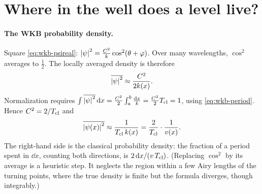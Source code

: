 \section{Where in the well does a level live?}\label{sec:wkb-where}

\paragraph{The WKB probability density.} Square \cref{eq:wkb-psireal}: $\left\lvert \psi\right\rvert^2=\frac{C^2}{k}\cos^2(\theta+\varphi)$. Over many wavelengths, $\cos^2$ averages to $\frac12$. The locally averaged density is therefore
\begin{equation}
\overline{\left\lvert \psi\right\rvert^2}\approx\frac{C^2}{2k(x)}.
\end{equation}
Normalization requires $\int\overline{\left\lvert \psi\right\rvert^2}\,\mathrm{d} x=\frac{C^2}{2}\int_a^b\frac{\mathrm{d} x}{k}=\frac{C^2}{2}T_{\rm cl}=1$, using \cref{eq:wkb-period}. Hence $C^2=2/T_{\rm cl}$ and
\begin{equation}
\overline{\left\lvert \psi(x)\right\rvert^2}\approx\frac{1}{T_{\rm cl}\,k(x)}=\frac{2}{T_{\rm cl}}\cdot\frac{1}{v(x)}.
\label{eq:wkb-density-x}
\end{equation}
The right-hand side is the classical probability density: the fraction of a period spent in $\dd x$, counting both directions, is $2\,\mathrm{d} x/(v\,T_{\rm cl})$. (Replacing $\cos^2$ by its average is a heuristic step. It neglects the region within a few Airy lengths of the turning points, where the true density is finite but the formula diverges, though integrably.)

